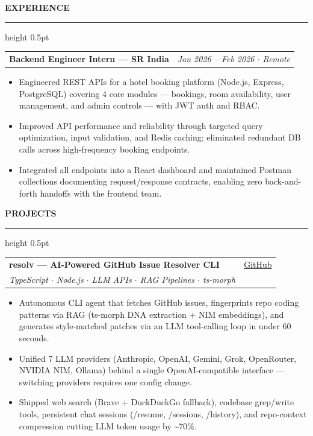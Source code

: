 \documentclass[a4paper,10pt]{article}
\newcommand{\fontsizesection}{\fontsize{8.2}{11}\selectfont}
\newcommand{\fontsizemeta}{\fontsize{8.2}{12}\selectfont}
\newcommand{\fontsizetitle}{\fontsize{10}{13}\selectfont}
\newcommand{\fontsizebody}{\fontsize{9}{14}\selectfont}
\newcommand{\resumesection}[1]{%
    \vspace{8pt}
    {\color{accent}\fontsizesection\textbf{\MakeUppercase{#1}}}
    \vspace{2pt}
    {\color{rule}\hrule height 0.5pt}
    \vspace{4pt}
}
\begin{document}
\resumesection{Experience}
\begin{tabularx}{\textwidth}{@{}X r@{}}
    {\fontsizetitle\textbf{Backend Engineer Intern — SR India}} & {\fontsizemeta\color{gray}\textit{Jan 2026 -- Feb 2026 $\cdot$ Remote}}
\end{tabularx}
\vspace{2pt}
\begin{itemize}[leftmargin=12pt, labelsep=6pt, itemsep=1.5pt, topsep=0pt, parsep=0pt]
    \item[\raisebox{0.25ex}{\tiny$\bullet$}] {\fontsizebody Engineered REST APIs for a hotel booking platform (Node.js, Express, PostgreSQL) covering 4 core modules — bookings, room availability, user management, and admin controls — with JWT auth and RBAC.}
    \item[\raisebox{0.25ex}{\tiny$\bullet$}] {\fontsizebody Improved API performance and reliability through targeted query optimization, input validation, and Redis caching; eliminated redundant DB calls across high-frequency booking endpoints.}
    \item[\raisebox{0.25ex}{\tiny$\bullet$}] {\fontsizebody Integrated all endpoints into a React dashboard and maintained Postman collections documenting request/response contracts, enabling zero back-and-forth handoffs with the frontend team.}
\end{itemize}

\resumesection{Projects}

\begin{tabularx}{\textwidth}{@{}X r@{}}
    {\fontsizetitle\textbf{resolv — AI-Powered GitHub Issue Resolver CLI}} & {\fontsizemeta\href{https://github.com/vednarvekar/resolv-v2}{GitHub}} \\
    {\fontsizemeta\color{gray}\textit{TypeScript $\cdot$ Node.js $\cdot$ LLM APIs $\cdot$ RAG Pipelines $\cdot$ ts-morph}} &
\end{tabularx}
\vspace{2pt}
\begin{itemize}[leftmargin=12pt, labelsep=6pt, itemsep=1.5pt, topsep=0pt, parsep=0pt]
    \item[\raisebox{0.25ex}{\tiny$\bullet$}] {\fontsizebody Autonomous CLI agent that fetches GitHub issues, fingerprints repo coding patterns via RAG (ts-morph DNA extraction + NIM embeddings), and generates style-matched patches via an LLM tool-calling loop in under 60 seconds.}
    \item[\raisebox{0.25ex}{\tiny$\bullet$}] {\fontsizebody Unified 7 LLM providers (Anthropic, OpenAI, Gemini, Grok, OpenRouter, NVIDIA NIM, Ollama) behind a single OpenAI-compatible interface — switching providers requires one config change.}
    \item[\raisebox{0.25ex}{\tiny$\bullet$}] {\fontsizebody Shipped web search (Brave + DuckDuckGo fallback), codebase grep/write tools, persistent chat sessions (/resume, /sessions, /history), and repo-context compression cutting LLM token usage by \textasciitilde{}70\%.}
\end{itemize}
\end{document}
